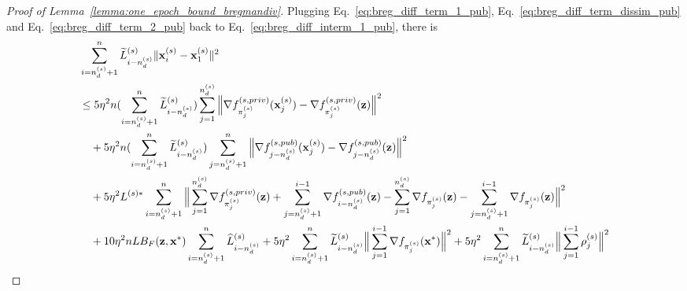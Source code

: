 \begin{proof}[Proof of Lemma~\ref{lemma:one_epoch_bound_bregmandiv}]
    Plugging Eq.~\ref{eq:breg_diff_term_1_pub}, Eq.~\ref{eq:breg_diff_term_dissim_pub} and Eq.~\ref{eq:breg_diff_term_2_pub} back to Eq.~\ref{eq:breg_diff_interm_1_pub}, there is
    \begin{align}
    \label{eq:breg_div_interm_ub_pub}
        &\sum_{i=n_d^{(s)}+1}^{n}\widetilde{L}_{i-n_d^{(s)}}^{(s)}\|{\mathbf{x}}_i^{(s)} - {\mathbf{x}}_1^{(s)}\|^2\\
        \nonumber
        &\leq 5 \eta^2 n (\sum_{i=n_d^{(s)}+1}^{n} \widetilde{L}_{i-n_d^{(s)}}^{(s)}) \sum_{j=1}^{n_d^{(s)}} \Big\| \nabla f_{\pi_j^{(s)}}^{(s, priv)}({\mathbf{x}}_j^{(s)}) - \nabla f_{\pi_j^{(s)}}^{(s, priv)}({\mathbf{z}})\Big\|^2\\
        \nonumber
        &\quad + 5\eta^2 n (\sum_{i=n_d^{(s)}+1}^{n} \widetilde{L}_{i-n_d^{(s)}}^{(s)}) \sum_{j=n_d^{(s)}+1}^{n}\Big\| \nabla f_{j-n_d^{(s)}}^{(s, pub)}({\mathbf{x}}_j^{(s)}) - \nabla f_{j-n_d^{(s)}}^{(s, pub)}({\mathbf{z}})\Big\|^2\\
    \nonumber
        &\quad + 5\eta^2 L^{(s)*} \sum_{i=n_d^{(s)} + 1}^{n} \Big\| \sum_{j=1}^{n_d^{(s)}} \nabla f_{\pi_j^{(s)}}^{(s, priv)}({\mathbf{z}}) + \sum_{j=n_d^{(s)}+1}^{i-1} \nabla f_{i-n_d^{(s)}}^{(s, pub)}({\mathbf{z}})
            - \sum_{j=1}^{n_d^{(s)}} \nabla f_{\pi_j^{(s)}}({\mathbf{z}}) - \sum_{j=n_d^{(s)}+1}^{i-1} \nabla f_{\pi_j^{(s)}}({\mathbf{z}})
        \Big\|^2\\
        \nonumber
        &\quad 
        + 10 \eta^2 n L B_F({\mathbf{z}}, {\mathbf{x}}^*) \sum_{i=n_d^{(s)}+1}^{n} \widehat{L}_{i-n_d^{(s)}}^{(s)}
        + 5\eta^2 \sum_{i=n_d^{(s)}+1}^{n} \widetilde{L}_{i-n_d^{(s)}}^{(s)}\Big\| \sum_{j=1}^{i-1} \nabla f_{\pi_j^{(s)}}({\mathbf{x}}^*)\Big\|^2
        + 5\eta^2 \sum_{i=n_d^{(s)}+1}^{n} \widetilde{L}_{i-n_d^{(s)}}^{(s)} \Big\| \sum_{j=1}^{i-1} \rho_j^{(s)}\Big\|^2
    \end{align}



\end{proof}
